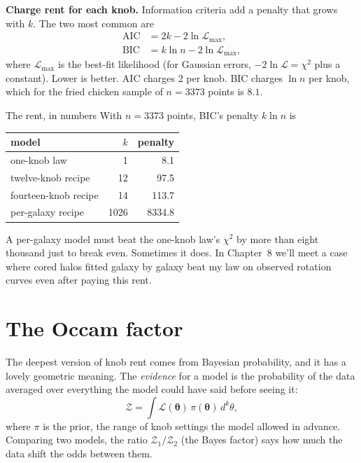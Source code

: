 \textbf{Charge rent for each knob.} Information criteria add a penalty that grows with $k$. The two most common are
\begin{align}
\mathrm{AIC}&=2k-2\ln\mathcal{L}_{\max},\\
\mathrm{BIC}&=k\ln n-2\ln\mathcal{L}_{\max},
\end{align}
where $\mathcal{L}_{\max}$ is the best-fit likelihood (for Gaussian errors, $-2\ln\mathcal{L}=\chi^2$ plus a constant). Lower is better. AIC charges 2 per knob. BIC charges $\ln n$ per knob, which for the fried chicken sample of $n=3373$ points is $8.1$.

\begin{knobbox}{The rent, in numbers}
With $n=3373$ points, BIC's penalty $k\ln n$ is
\begin{center}
\begin{tabular}{lrr}
\toprule
model & $k$ & penalty\\
\midrule
one-knob law & 1 & 8.1\\
twelve-knob recipe & 12 & 97.5\\
fourteen-knob recipe & 14 & 113.7\\
per-galaxy recipe & 1026 & 8334.8\\
\bottomrule
\end{tabular}
\end{center}
A per-galaxy model must beat the one-knob law's $\chi^2$ by more than eight thousand just to break even. Sometimes it does. In Chapter~8 we'll meet a case where cored halos fitted galaxy by galaxy beat my law on observed rotation curves even after paying this rent.
\end{knobbox}



\section{The Occam factor}

The deepest version of knob rent comes from Bayesian probability, and it has a lovely geometric meaning. The \emph{evidence} for a model is the probability of the data averaged over everything the model could have said before seeing it:
\begin{equation}
\mathcal{Z}=\int \mathcal{L}(\boldsymbol\theta)\,\pi(\boldsymbol\theta)\,d^k\theta,
\end{equation}
where $\pi$ is the prior, the range of knob settings the model allowed in advance. Comparing two models, the ratio $\mathcal{Z}_1/\mathcal{Z}_2$ (the Bayes factor) says how much the data shift the odds between them.

